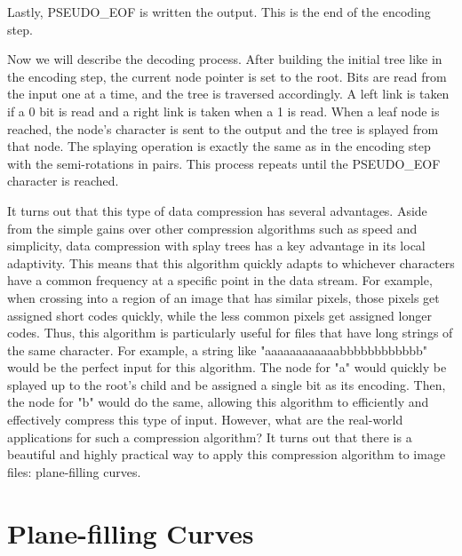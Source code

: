 \documentclass[twoside]{article}
\begin{document}
\begin{multicols}{2}
Lastly, PSEUDO\_EOF is written the output. This is the end of the encoding step.

Now we will describe the decoding process. After building the initial tree like in the encoding step, the current node pointer is set to the root. Bits are read from the input one at a time, and the tree is traversed accordingly. A left link is taken if a 0 bit is read and a right link is taken when a 1 is read. When a leaf node is reached, the node's character is sent to the output and the tree is splayed from that node. The splaying operation is exactly the same as in the encoding step with the semi-rotations in pairs. This process repeats until the PSEUDO\_EOF character is reached.

It turns out that this type of data compression has several advantages. Aside from the simple gains over other compression algorithms such as speed and simplicity, data compression with splay trees has a key advantage in its local adaptivity. This means that this algorithm quickly adapts to whichever characters have a common frequency at a specific point in the data stream. For example, when crossing into a region of an image that has similar pixels, those pixels get assigned short codes quickly, while the less common pixels get assigned longer codes. Thus, this algorithm is particularly useful for files that have long strings of the same character. For example, a string like "aaaaaaaaaaaabbbbbbbbbbbb" would be the perfect input for this algorithm. The node for "a" would quickly be splayed up to the root's child and be assigned a single bit as its encoding. Then, the node for "b" would do the same, allowing this algorithm to efficiently and effectively compress this type of input. However, what are the real-world applications for such a compression algorithm? It turns out that there is a beautiful and highly practical way to apply this compression algorithm to image files: plane-filling curves.

\section{Plane-filling Curves}


\end{multicols}
\end{document}
